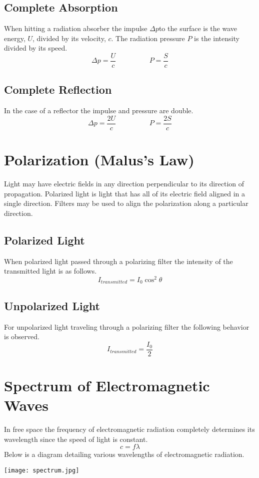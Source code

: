 \subsection{Complete Absorption}
When hitting a radiation absorber the impulse $\Delta p$to the surface is the wave energy, $U$, divided by its velocity, $c$.  The radiation pressure $P$ is the intensity divided by its speed.
$$\Delta p=\frac{U}{c} \hspace{2cm} P=\frac{S}{c}$$
\subsection{Complete Reflection}
In the case of a reflector the impulse and pressure are double.
$$\Delta p=\frac{2U}{c} \hspace{2cm} P=\frac{2S}{c}$$

\section{Polarization (Malus's Law)}
Light may have electric fields in any direction perpendicular to its direction of propagation.  Polarized light is light that has all of its electric field aligned in a single direction.  Filters may be used to align the polarization along a particular direction.
\subsection{Polarized Light}
When polarized light passed through a polarizing filter the intensity of the transmitted light is as follows.
$$I_{transmitted}=I_0\cos^2 \theta$$
\subsection{Unpolarized Light}
For unpolarized light traveling through a polarizing filter the following behavior is observed.
$$I_{transmitted}=\frac{I_0}{2}$$

\section{Spectrum of Electromagnetic Waves}
In free space the frequency of electromagnetic radiation completely determines its wavelength since the speed of light is constant.
$$c=f \lambda$$
Below is a diagram detailing various wavelengths of electromagnetic radiation.
\begin{center}
\texttt{[image: spectrum.jpg]}

\end{center}
